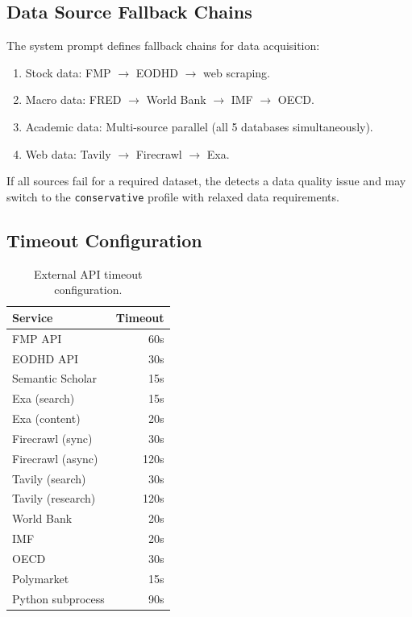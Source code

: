\subsection{Data Source Fallback Chains}

The system prompt defines fallback chains for data acquisition:

\begin{enumerate}
  \item Stock data: FMP $\to$ EODHD $\to$ web scraping.
  \item Macro data: FRED $\to$ World Bank $\to$ IMF $\to$ OECD.
  \item Academic data: Multi-source parallel (all 5 databases simultaneously).
  \item Web data: Tavily $\to$ Firecrawl $\to$ Exa.
\end{enumerate}

If all sources fail for a required dataset, the \governor detects a data quality issue and may switch to the \texttt{conservative} profile with relaxed data requirements.

\subsection{Timeout Configuration}

\begin{table}[H]
\centering
\caption{External API timeout configuration.}
\label{tab:api-timeouts}
\begin{tabular}{lr}
\toprule
\textbf{Service} & \textbf{Timeout} \\
\midrule
FMP API & 60s \\
EODHD API & 30s \\
Semantic Scholar & 15s \\
Exa (search) & 15s \\
Exa (content) & 20s \\
Firecrawl (sync) & 30s \\
Firecrawl (async) & 120s \\
Tavily (search) & 30s \\
Tavily (research) & 120s \\
World Bank & 20s \\
IMF & 20s \\
OECD & 30s \\
Polymarket & 15s \\
Python subprocess & 90s \\
\bottomrule
\end{tabular}
\end{table}

